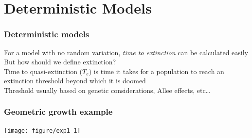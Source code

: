 \documentclass[color=usenames,dvipsnames]{beamer}\usepackage[]{graphicx}\usepackage[]{color}
\begin{document}
\section{Deterministic Models}






\begin{frame}
  \frametitle{Deterministic models}
  \Large
  For a model with no random variation, \textit{time to extinction} can
      be calculated easily \\
  \pause \vfill
  But how should we define extinction? \\
  \pause \vfill
  Time to quasi-extinction ($T_e$) is time it takes for a
      population to reach an extinction threshold beyond which it is
      doomed \\
  \pause \vfill
  Threshold usually based on genetic considerations, Allee
      effects, etc\dots
\end{frame}





\begin{frame}[fragile]
  \frametitle{Geometric growth example}

\texttt{[image: figure/exp1-1]}
\end{frame}
\end{document}
